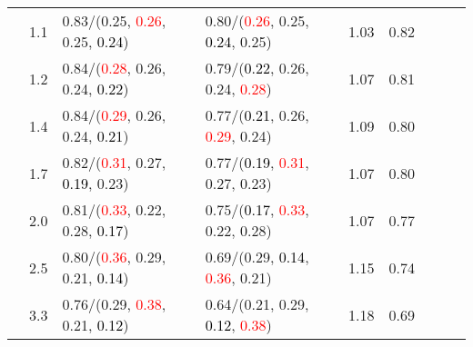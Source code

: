 \documentclass[10pt,a4paper]{report}
\begin{document}
\begin{table}[!htbp]
\begin{center}
{\begin{tabular}{ccllccccc}
				  & 1.1                               & 0.83/(0.25, \textcolor{red}{0.26}, 0.25, \textcolor{black}{0.24})                                                                               & 0.80/(\textcolor{red}{0.26}, 0.25, \textcolor{black}{0.24}, 0.25)                                                                               & 1.03             & 0.82                     \\
				  & 1.2                               & 0.84/(\textcolor{red}{0.28}, 0.26, 0.24, \textcolor{black}{0.22})                                                                               & 0.79/(\textcolor{black}{0.22}, 0.26, 0.24, \textcolor{red}{0.28})                                                                               & 1.07             & 0.81                     \\
				  & 1.4                               & 0.84/(\textcolor{red}{0.29}, 0.26, 0.24, \textcolor{black}{0.21})                                                                               & 0.77/(\textcolor{black}{0.21}, 0.26, \textcolor{red}{0.29}, 0.24)                                                                               & 1.09             & 0.80                     \\
				  & 1.7                               & 0.82/(\textcolor{red}{0.31}, 0.27, \textcolor{black}{0.19}, 0.23)                                                                               & 0.77/(\textcolor{black}{0.19}, \textcolor{red}{0.31}, 0.27, 0.23)                                                                               & 1.07             & 0.80                     \\
				  & 2.0                               & 0.81/(\textcolor{red}{0.33}, 0.22, 0.28, \textcolor{black}{0.17})                                                                               & 0.75/(\textcolor{black}{0.17}, \textcolor{red}{0.33}, 0.22, 0.28)                                                                               & 1.07             & 0.77                     \\
				  & 2.5                               & 0.80/(\textcolor{red}{0.36}, 0.29, 0.21, \textcolor{black}{0.14})                                                                               & 0.69/(0.29, \textcolor{black}{0.14}, \textcolor{red}{0.36}, 0.21)                                                                               & 1.15             & 0.74                     \\
				  & 3.3                               & 0.76/(0.29, \textcolor{red}{0.38}, 0.21, \textcolor{black}{0.12})                                                                               & 0.64/(0.21, 0.29, \textcolor{black}{0.12}, \textcolor{red}{0.38})                                                                               & 1.18             & 0.69                     \\

\end{tabular}}
\end{center}
\end{table}
\end{document}
